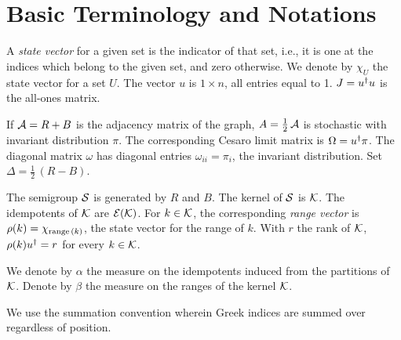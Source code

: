 


\section{Basic Terminology and Notations}
\label{sec:6.1}

A \textsl{state vector\/} for a given set is the indicator of that set, i.e., it is one at the indices which belong to the given set, and zero
otherwise. We denote by $\chi_U$ the state vector for a set $U$. The vector $u$ is $1\times n$, all entries equal to 1.
$J=\dg  u.u$ is the all-ones matrix.

If ${\mathcal A }=R+B$ is the adjacency matrix of the graph, $A=\frac12\,{\mathcal A }$ is stochastic with invariant distribution $\pi$. 
The corresponding Cesaro limit matrix is $\Omega=\dg u.\pi$. The diagonal matrix $\omega$ has diagonal entries
$\omega_{ii}=\pi_i$, the invariant distribution. Set $\Delta = \frac12\,(R-B)$.

The semigroup ${\mathcal S}$ is generated by $R$ and $B$. The kernel of ${\mathcal S}$ is ${\mathcal K}$. The idempotents of ${\mathcal K}$ are ${\mathcal E }({\mathcal K})$.
For $k\in{\mathcal K}$, the corresponding \textsl{range vector\/} is $\rho(k)=\chi_{{\rm range\,}(k)}$, the state vector for the range of $k$.
With $r$ the rank of ${\mathcal K}$, $\rho(k)\dg u.=r$ for every $k\in{\mathcal K}$.


We denote by $\alpha$ the measure on the idempotents induced from the partitions of ${\mathcal K}$. 
Denote by $\beta$ the measure on the ranges of the kernel ${\mathcal K}$.

We use the summation convention wherein Greek indices are summed over regardless of position.
